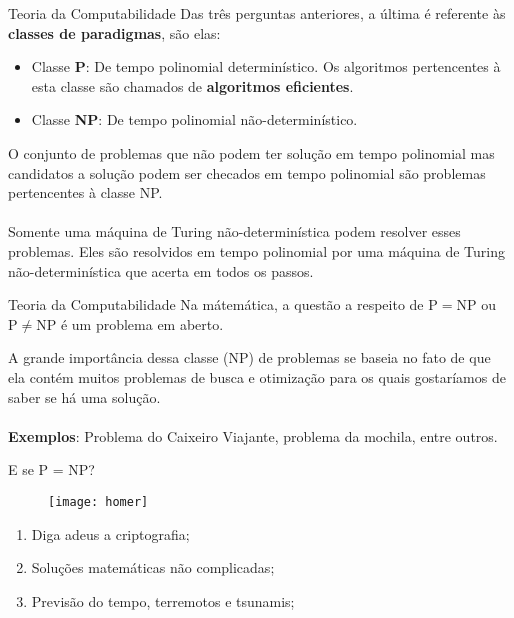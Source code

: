 \documentclass{beamer}
\begin{document}
\begin{frame}{Teoria da Computabilidade}
	Das três perguntas anteriores, a última é referente às \textbf{classes de paradigmas}, são elas:
	
	\begin{itemize}
		\item Classe \textbf{P}: De tempo polinomial determinístico. Os algoritmos pertencentes à esta classe são chamados de \textbf{algoritmos eficientes}.
		\item Classe \textbf{NP}: De tempo polinomial não-determinístico.
	\end{itemize}
	\justify O conjunto de problemas que não podem ter solução em tempo polinomial mas candidatos a solução podem ser checados em tempo polinomial são problemas pertencentes à classe NP.\\~\\
	
	Somente uma máquina de Turing não-determinística podem resolver esses problemas. Eles são resolvidos em tempo polinomial por uma máquina de Turing não-determinística que acerta em todos os passos.
\end{frame}

\begin{frame}{Teoria da Computabilidade}
	Na mátemática, a questão a respeito de $\mathrm{P}=\mathrm{NP}$ ou $\mathrm{P}\neq \mathrm{NP}$ é um problema em aberto.	
	
	A grande importância dessa classe (NP) de problemas se baseia no fato de que ela contém muitos problemas de busca e otimização para os quais gostaríamos de saber se há uma solução.\\~\\
	
	\textbf{Exemplos}: Problema do Caixeiro Viajante, problema da mochila, entre outros. 
\end{frame}

\begin{frame}{E se P = NP?}
	\begin{figure}
		\centering
		\texttt{[image: homer]}
	\end{figure}
	
	\begin{enumerate}
		\item Diga adeus a criptografia;
		\item Soluções matemáticas não complicadas;
		\item Previsão do tempo, terremotos e tsunamis;
	\end{enumerate}
\end{frame}
\end{document}
